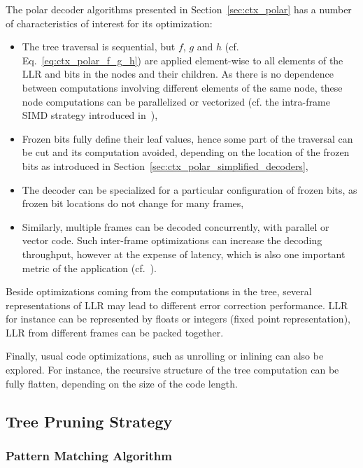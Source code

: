 The polar decoder algorithms presented in Section~\ref{sec:ctx_polar} has a
number of characteristics of interest for its optimization:
\begin{itemize}
  \item The tree traversal is sequential, but $f$, $g$ and $h$ (cf.
    Eq.~\ref{eq:ctx_polar_f_g_h}) are applied element-wise to all elements of
    the LLR and bits in the nodes and their children. As there is no dependence
    between computations involving different elements of the same node, these
    node computations can be parallelized or vectorized (cf. the
    intra-frame SIMD strategy introduced in~\cite{Giard2014}),
  \item Frozen bits fully define their leaf values, hence some part of the
    traversal can be cut and its computation avoided, depending on the
    location of the frozen bits as introduced in
    Section~\ref{sec:ctx_polar_simplified_decoders},
  \item The decoder can be specialized for a particular configuration of frozen
    bits, as frozen bit locations do not change for many frames,
  \item Similarly, multiple frames can be decoded concurrently, with parallel or
    vector code. Such inter-frame optimizations can increase the decoding
    throughput, however at the expense of latency, which is also one important
    metric of the application (cf.~\cite{LeGal2015a}).
\end{itemize}

Beside optimizations coming from the computations in the tree, several
representations of LLR may lead to different error correction performance. LLR
for instance can be represented by floats or integers (fixed point
representation), LLR from different frames can be packed together.

Finally, usual code optimizations, such as unrolling or inlining can also be
explored. For instance, the recursive structure of the tree computation can be
fully flatten, depending on the size of the code length.

\subsection{Tree Pruning Strategy}
\label{sec:opt_polar_tree_pruning}

\subsubsection{Pattern Matching Algorithm}
\label{sec:opt_polar_pattern_matching}


